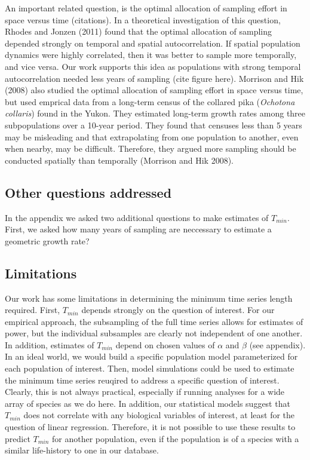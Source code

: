 \documentclass[12pt,]{article}
\begin{document}
An important related question, is the optimal allocation of sampling
effort in space versus time (citations). In a theoretical investigation
of this question, Rhodes and Jonzen (2011) found that the optimal
allocation of sampling depended strongly on temporal and spatial
autocorrelation. If spatial population dynamics were highly correlated,
then it was better to sample more temporally, and vice versa. Our work
supports this idea as populations with strong temporal autocorrelation
needed less years of sampling (cite figure here). Morrison and Hik
(2008) also studied the optimal allocation of sampling effort in space
versus time, but used emprical data from a long-term census of the
collared pika (\emph{Ochotona collaris}) found in the Yukon. They
estimated long-term growth rates among three subpopulations over a
10-year period. They found that censuses less than 5 years may be
misleading and that extrapolating from one population to another, even
when nearby, may be difficult. Therefore, they argued more sampling
should be conducted spatially than temporally (Morrison and Hik 2008).

\subsection{Other questions addressed}\label{other-questions-addressed}

In the appendix we asked two additional questions to make estimates of
\(T_{min}\). First, we asked how many years of sampling are neccessary
to estimate a geometric growth rate?

\subsection{Limitations}\label{limitations}

Our work has some limitations in determining the minimum time series
length required. First, \(T_{min}\) depends strongly on the question of
interest. For our empirical approach, the subsampling of the full time
series allows for estimates of power, but the individual subsamples are
clearly not independent of one another. In addition, estimates of
\(T_{min}\) depend on chosen values of \(\alpha\) and \(\beta\) (see
appendix). In an ideal world, we would build a specific population model
parameterized for each population of interest. Then, model simulations
could be used to estimate the minimum time series reuqired to address a
specific question of interest. Clearly, this is not always practical,
especially if running analyses for a wide array of species as we do
here. In addition, our statistical models suggest that \(T_{min}\) does
not correlate with any biological variables of interest, at least for
the question of linear regression. Therefore, it is not possible to use
these results to predict \(T_{min}\) for another population, even if the
population is of a species with a similar life-history to one in our
database.
\end{document}

